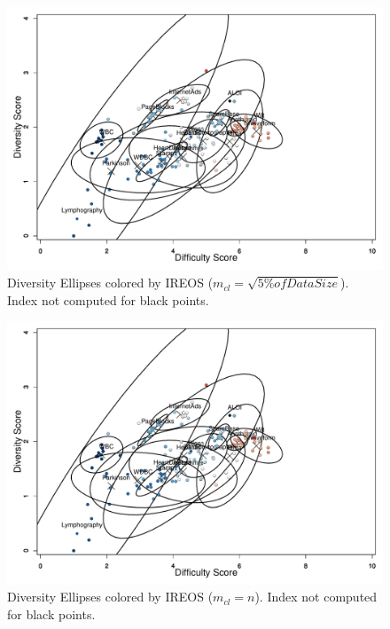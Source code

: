 \documentclass[11pt]{article}
\begin{document}
{\begin{figure}[h!]
\center
\includegraphics[width=\textwidth]{figs/ellipse_sqrt.pdf}
\captionsetup{justification=centering}
\caption{Diversity Ellipses colored by IREOS ($m_{cl} = \sqrt{5\% of Data Size}$). Index not computed for black points.}
\label{fig:DiversityEllipses_sqrt}
\end{figure}
\newpage

\begin{figure}[h!]
\center
\includegraphics[width=\textwidth]{figs/ellipse_n.pdf}
\captionsetup{justification=centering}
\caption{Diversity Ellipses colored by IREOS ($m_{cl} = n$). Index not computed for black points.}
\label{fig:DiversityEllipses_n}
\end{figure}

\newpage

}
\end{document}
